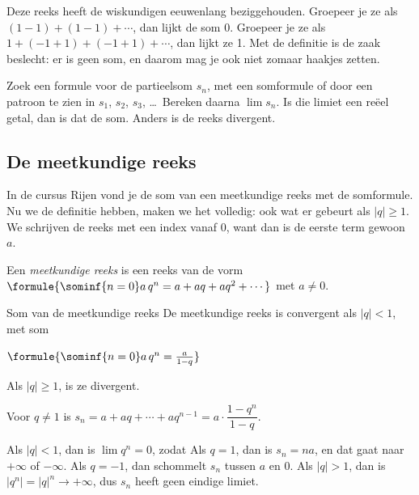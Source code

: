 Deze reeks heeft de wiskundigen eeuwenlang beziggehouden. Groepeer je ze als $(1 - 1) + (1 - 1) + \cdots$, dan lijkt de som 0. Groepeer je ze als $1 + (-1 + 1) + (-1 + 1) + \cdots$, dan lijkt ze 1. Met de definitie is de zaak beslecht: er is geen som, en daarom mag je ook niet zomaar haakjes zetten.

\begin{werkwijze}
Zoek een formule voor de partieelsom $s_n$, met een somformule of door een patroon te zien in $s_1$, $s_2$, $s_3$, \ldots\ Bereken daarna $\lim s_n$. Is die limiet een reëel getal, dan is dat de som. Anders is de reeks divergent.
\end{werkwijze}


\begin{oefeningen}
\end{oefeningen}

\subsection{De meetkundige reeks}

In de cursus Rijen vond je de som van een meetkundige reeks met de somformule. Nu we de definitie hebben, maken we het volledig: ook wat er gebeurt als $|q| \geqslant 1$. We schrijven de reeks met een index vanaf 0, want dan is de eerste term gewoon $a$.

\begin{theorie}
Een \emph{meetkundige reeks} is een reeks van de vorm $\formule{\sominf{n=0} a\,q^n = a + aq + aq^2 + \cdots}$ met $a \neq 0$.

\begin{stelling}{Som van de meetkundige reeks}
De meetkundige reeks is convergent als $|q| < 1$, met som

\vspace{1mm}
\qquad $\formule{\sominf{n=0} a\,q^n = \frac{a}{1-q}}$

\vspace{1mm}
Als $|q| \geqslant 1$, is ze divergent.
\end{stelling}

\begin{bewijs}
Voor $q \neq 1$ is $s_n = a + aq + \cdots + aq^{n-1} = a \cdot \dfrac{1 - q^n}{1 - q}$.

Als $|q| < 1$, dan is $\lim q^n = 0$, zodat
Als $q = 1$, dan is $s_n = na$, en dat gaat naar $+\infty$ of $-\infty$. Als $q = -1$, dan schommelt $s_n$ tussen $a$ en 0. Als $|q| > 1$, dan is $|q^n| = |q|^n \to +\infty$, dus $s_n$ heeft geen eindige limiet.
\end{bewijs}
\end{theorie}


